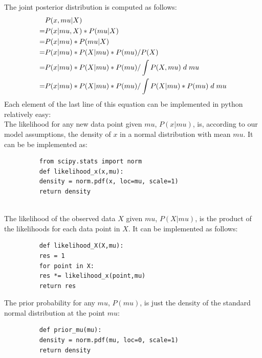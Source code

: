 \documentclass{article}
\begin{document}
The joint posterior distribution is computed as follows:
\begin{equation}
\begin{split}
&P(x,mu|X) \\
= &P(x|mu,X) * P(mu|X) \\
= &P(x|mu) * P(mu|X) \\
= &P(x|mu) * P(X|mu) * P(mu) / P(X) \\
= &P(x|mu) * P(X|mu) * P(mu) / \int P(X,mu) \hspace{1mm} d \hspace{1mm} mu \\
= &P(x|mu) * P(X|mu) * P(mu) / \int P(X|mu) * P(mu) \hspace{1mm} d \hspace{1mm} mu
\end{split}
\end{equation}
Each element of the last line of this equation can be implemented in python relatively easy: 
\\
The likelihood for any new data point given $mu$, $P(x|mu)$, is, according to our model assumptions, the density of $x$ in a normal distribution with mean $mu$. It can be be implemented as:
\begin{figure}[h]
	\begin{lstlisting}
	from scipy.stats import norm
	def likelihood_x(x,mu):
	density = norm.pdf(x, loc=mu, scale=1)
	return density
	\end{lstlisting}
	
\label{fig:likelihood_new_data_point}
\end{figure}\\
The likelihood of the observed data $X$ given $mu$, $P(X|mu)$, is the product of the likelihoods for each data point in $X$. It can be implemented as follows: 
\begin{figure}[H]
	\begin{lstlisting}
	def likelihood_X(X,mu):
	res = 1
	for point in X:
	res *= likelihood_x(point,mu)
	return res
	\end{lstlisting}
	\label{fig:likelihood_observed_data}
\end{figure}
The prior probability for any $mu$, $P(mu)$, is just the density of the standard normal distribution at the point $mu$:
\begin{figure}[H]
	\begin{lstlisting}
	def prior_mu(mu):
	density = norm.pdf(mu, loc=0, scale=1)
	return density
	\end{lstlisting}
	\label{fig:prior_mu}
\end{figure}
\end{document}
